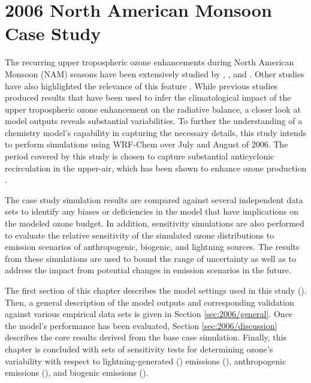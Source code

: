 \chapter{2006 North American Monsoon Case Study} \label{ch:2006}

\ifpdf
    \graphicspath{{Chapter_2006/figures/PNG/}{Chapter_2006/figures/PDF/}{Chapter_2006/figures/}}
\else
    \graphicspath{{Chapter_2006/figures/EPS/}{Chapter_2006/figures/}}
\fi

The recurring upper tropospheric ozone enhancements during North American Monsoon (NAM) seasons have been extensively studied by \citet{Li:2005ss}, \citet{Cooper:2006dq,Cooper:2007cr,Cooper:2009nx}, and \citet{Barth:2012qf}. Other studies have also highlighted the relevance of this feature \citep[e.g.][]{Hudman:2007fu,Choi:2009bh,Jourdain:2010tw}. While previous studies produced results that have been used to infer the climatological impact of the upper tropospheric ozone enhancement on the radiative balance, a closer look at model outputs reveals substantial variabilities. To further the understanding of a chemistry model's capability in capturing the necessary details, this study intends to perform simulations using WRF-Chem \citep{Grell:2005fv} over July and August of 2006. The period covered by this study is chosen to capture substantial anticyclonic recirculation in the upper-air, which has been shown to enhance ozone production \citep{Cooper:2007cr}.

The case study simulation results are compared against several independent data sets to identify any biases or deficiencies in the
model that have implications on the modeled ozone budget. In addition, sensitivity simulations are also performed to evaluate the relative
sensitivity of the simulated ozone distributions to emission scenarios of anthropogenic, biogenic, and lightning sources. The results from
these simulations are used to bound the range of uncertainty as well as to address the impact from potential changes in emission scenarios
in the future.

The first section of this chapter describes the model settings used in this study (). Then, a general description of the model outputs and corresponding validation against various empirical data sets is given in Section \ref{sec:2006/general}. Once the model's performance has been evaluated, Section \ref{sec:2006/discussion} describes the core results derived from the base case simulation. Finally, this chapter is concluded with sets of sensitivity tests for determining ozone's variability with respect to  lightning-generated  (\lnox) emissions (), anthropogenic emissions (), and biogenic emissions ().


